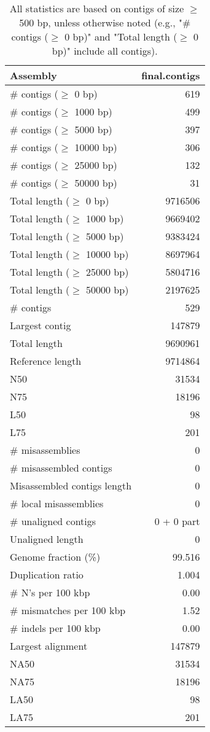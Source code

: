 \documentclass[12pt,a4paper]{article}
\begin{document}
\begin{table}[ht]
\begin{center}
\caption{All statistics are based on contigs of size $\geq$ 500 bp, unless otherwise noted (e.g., "\# contigs ($\geq$ 0 bp)" and "Total length ($\geq$ 0 bp)" include all contigs).}
\begin{tabular}{|l*{1}{|r}|}
\hline
Assembly & final.contigs \\ \hline
\# contigs ($\geq$ 0 bp) & 619 \\ \hline
\# contigs ($\geq$ 1000 bp) & 499 \\ \hline
\# contigs ($\geq$ 5000 bp) & 397 \\ \hline
\# contigs ($\geq$ 10000 bp) & 306 \\ \hline
\# contigs ($\geq$ 25000 bp) & 132 \\ \hline
\# contigs ($\geq$ 50000 bp) & 31 \\ \hline
Total length ($\geq$ 0 bp) & 9716506 \\ \hline
Total length ($\geq$ 1000 bp) & 9669402 \\ \hline
Total length ($\geq$ 5000 bp) & 9383424 \\ \hline
Total length ($\geq$ 10000 bp) & 8697964 \\ \hline
Total length ($\geq$ 25000 bp) & 5804716 \\ \hline
Total length ($\geq$ 50000 bp) & 2197625 \\ \hline
\# contigs & 529 \\ \hline
Largest contig & 147879 \\ \hline
Total length & 9690961 \\ \hline
Reference length & 9714864 \\ \hline
N50 & 31534 \\ \hline
N75 & 18196 \\ \hline
L50 & 98 \\ \hline
L75 & 201 \\ \hline
\# misassemblies & 0 \\ \hline
\# misassembled contigs & 0 \\ \hline
Misassembled contigs length & 0 \\ \hline
\# local misassemblies & 0 \\ \hline
\# unaligned contigs & 0 + 0 part \\ \hline
Unaligned length & 0 \\ \hline
Genome fraction (\%) & 99.516 \\ \hline
Duplication ratio & 1.004 \\ \hline
\# N's per 100 kbp & 0.00 \\ \hline
\# mismatches per 100 kbp & 1.52 \\ \hline
\# indels per 100 kbp & 0.00 \\ \hline
Largest alignment & 147879 \\ \hline
NA50 & 31534 \\ \hline
NA75 & 18196 \\ \hline
LA50 & 98 \\ \hline
LA75 & 201 \\ \hline
\end{tabular}
\end{center}
\end{table}
\end{document}

